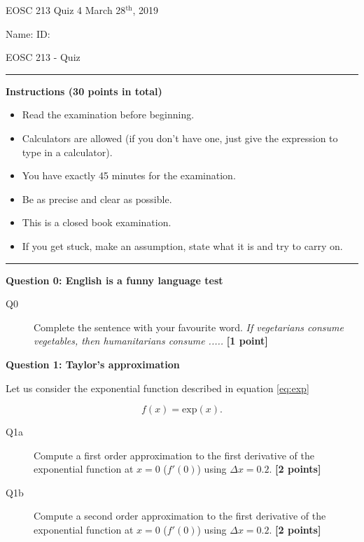 \documentclass{article}
\begin{document}
\pagestyle{empty}

\large{EOSC 213 Quiz 4} \hspace{10cm} \large{March 28$^{\textrm{th}}$, 2019}

\large{Name:} \hspace{12cm} \large{ID: }
\begin{center}
\Huge{EOSC 213 - Quiz}
\end{center}

\rule{\textwidth}{1pt}

\large{\textbf{Instructions (30 points in total)}}
\begin{multicols}{2}
\begin{itemize}
\item Read the examination before beginning.
\item Calculators are allowed (if you don't have one, just give the expression to type in a calculator).
\item You have exactly 45 minutes for the examination.
\item Be as precise and clear as possible.
\item This is a closed book examination.
\item If you get stuck, make an assumption, state what it is and try to carry on.
\end{itemize} 
\end{multicols}



\rule{\textwidth}{1pt}

\textbf{Question 0: English is a funny language test}

\begin{description}
\item [Q0] Complete the sentence with your favourite word. \textit{If vegetarians consume vegetables, then humanitarians consume .....}  \textbf{[1 point]}
\vspace{0.5cm}

\end{description}

\textbf{Question 1: Taylor's approximation}

Let us consider the exponential function described in equation \ref{eq:exp}

\begin{equation}
f(x) = \mathrm{exp}(x). \label{eq:exp}
\end{equation} 


\begin{description}
\item [Q1a] Compute a first order approximation to the first derivative of the exponential function at $x = 0$ ($f'(0)$) using $\Delta x  = 0.2$.  \textbf{[2 points]}
\vspace{3cm}
\item [Q1b] Compute a second order approximation to the first derivative of the exponential function at $x = 0$ ($f'(0)$) using $\Delta x  = 0.2$.  \textbf{[2 points]}
\vspace{3cm}

\end{description}
\end{document}
